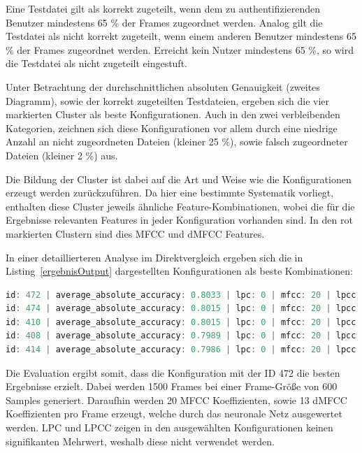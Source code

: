 Eine Testdatei gilt als korrekt zugeteilt, wenn dem zu authentifizierenden Benutzer mindestens 65 \% der Frames zugeordnet werden.
Analog gilt die Testdatei als nicht korrekt zugeteilt, wenn einem anderen Benutzer mindestens 65 \% der Frames zugeordnet werden.
Erreicht kein Nutzer mindestens 65 \%, so wird die Testdatei als nicht zugeteilt eingestuft.

Unter Betrachtung der durchschnittlichen absoluten Genauigkeit (zweites Diagramm), sowie der korrekt zugeteilten Testdateien, ergeben sich die vier markierten Cluster als beste Konfigurationen.
Auch in den zwei verbleibenden Kategorien, zeichnen sich diese Konfigurationen vor allem durch eine niedrige Anzahl an nicht zugeordneten Dateien (kleiner 25 \%), sowie falsch zugeordneter Dateien (kleiner 2 \%) aus.

Die Bildung der Cluster ist dabei auf die Art und Weise wie die Konfigurationen erzeugt werden zurückzuführen.
Da hier eine bestimmte Systematik vorliegt, enthalten diese Cluster jeweils ähnliche Feature-Kombinationen, wobei die für die Ergebnisse relevanten Features in jeder Konfiguration vorhanden sind.
In den rot markierten Clustern sind dies \ac{MFCC} und \ac{dMFCC} Features.

In einer detaillierteren Analyse im Direktvergleich ergeben sich die in Listing~\ref{ergebnisOutput} dargestellten Konfigurationen als beste Kombinationen:
\begin{lstlisting}[language=JavaScript,numbers=none,caption=Auswertung der Konfigurationen,label=ergebnisOutput]
id: 472 | average_absolute_accuracy: 0.8033 | lpc: 0 | mfcc: 20 | lpcc:  0 | delta_mfcc: 13
id: 474 | average_absolute_accuracy: 0.8015 | lpc: 0 | mfcc: 20 | lpcc: 13 | delta_mfcc: 13
id: 410 | average_absolute_accuracy: 0.8015 | lpc: 0 | mfcc: 20 | lpcc: 13 | delta_mfcc: 13
id: 408 | average_absolute_accuracy: 0.7989 | lpc: 0 | mfcc: 20 | lpcc:  0 | delta_mfcc: 13
id: 414 | average_absolute_accuracy: 0.7986 | lpc: 0 | mfcc: 20 | lpcc: 13 | delta_mfcc: 13
\end{lstlisting}

Die Evaluation ergibt somit, dass die Konfiguration mit der ID 472 die besten Ergebnisse erzielt.
Dabei werden 1500 Frames bei einer Frame-Größe von 600 Samples generiert.
Daraufhin werden 20 \ac{MFCC} Koeffizienten, sowie 13 \ac{dMFCC} Koeffizienten pro Frame erzeugt, welche durch das neuronale Netz ausgewertet werden.
\ac{LPC} und \ac{LPCC} zeigen in den ausgewählten Konfigurationen keinen signifikanten Mehrwert, weshalb diese nicht verwendet werden.

